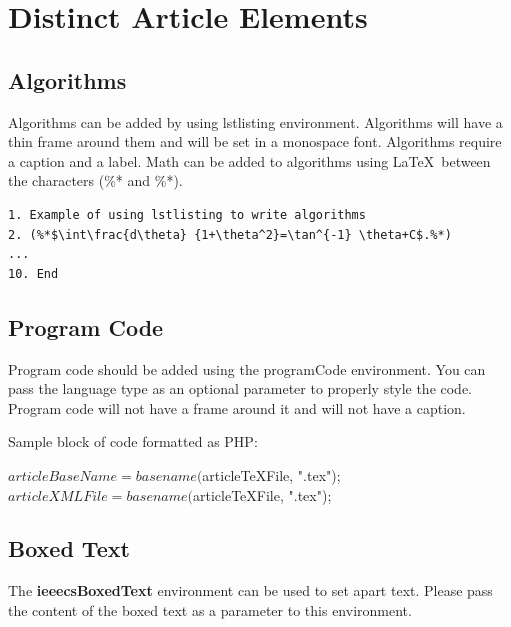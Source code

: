 \documentclass[hasAbstract,authorBox]{csmagazine}
\begin{document}
\pagebreak



\section{Distinct Article Elements}

\subsection{Algorithms}

Algorithms can be added by using lstlisting environment. Algorithms will have a thin frame around them and will be set in a monospace font. Algorithms require a caption and a label. Math can be added to algorithms using \LaTeX\ between the characters (\%* and \%*).


\begin{lstlisting}[caption={Add a caption for your algorithm here.}, label=Algorithm1]
1. Example of using lstlisting to write algorithms
2. (%*$\int\frac{d\theta} {1+\theta^2}=\tan^{-1} \theta+C$.%*)
...
10. End
\end{lstlisting}

\subsection{Program Code}

Program code should be added using the programCode environment. You can pass the language type as an optional parameter to properly style the code. Program code will not have a frame around it and will not have a caption.

Sample block of code formatted as PHP:

\begin{programCode}
[language=PhP]
$articleBaseName = basename($articleTeXFile, ".tex");
$articleXMLFile = basename($articleTeXFile, ".tex");
\end{programCode}


\subsection{Boxed Text}


\begin{ieeecsBoxedText}{The \textbf{ieeecsBoxedText} environment can be used to set apart text. Please pass the content of the boxed text as a parameter to this environment.}
\end{ieeecsBoxedText}
\end{document}
